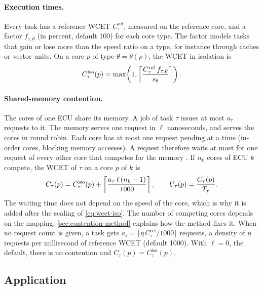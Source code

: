 \paragraph{Execution times.} Every task has a reference WCET
$C^{\mathrm{ref}}_\tau$, measured on the reference core, and a factor
$f_{\tau,\theta}$ (in percent, default 100) for each core type. The factor
models tasks that gain or lose more than the speed ratio on a type, for
instance through caches or vector units. On a core $p$ of type $\theta=
\theta(p)$, the WCET in isolation is
\begin{equation}
C^{\mathrm{iso}}_\tau(p)=\max\!\left(1,\left\lceil \frac{C^{\mathrm{ref}}_\tau\,
f_{\tau,\theta}}{s_\theta} \right\rceil\right).
\label{eq:wcet-iso}
\end{equation}

\paragraph{Shared-memory contention.}
\label{sec:contention}
The cores of one ECU share its memory. A job of task $\tau$ issues at most
$a_\tau$ requests to it. The memory serves one request in $\ell$
nanoseconds, and serves the cores in round robin. Each core has at most one
request pending at a time (in-order cores, blocking memory accesses). A
request therefore waits at most for one request of every other core that
competes for the memory \cite{paolieri2009hardware}. If $n_k$ cores of ECU $k$ compete, the
WCET of $\tau$ on a core $p$ of $k$ is
\begin{equation}
C_\tau(p)=C^{\mathrm{iso}}_\tau(p)+\left\lceil \frac{a_\tau\,\ell\,(n_k-1)}{1000} \right\rceil,
\qquad U_\tau(p)=\frac{C_\tau(p)}{T_\tau}.
\label{eq:wcet}
\end{equation}
The waiting time does not depend on the speed of the core, which is why it
is added after the scaling of \cref{eq:wcet-iso}. The number of competing
cores depends on the mapping: \cref{sec:contention-method} explains how
the method fixes it. When no request count is given, a task gets $a_\tau=
\lceil\eta\,C^{\mathrm{ref}}_\tau/1000\rceil$ requests, a density of
$\eta$ requests per millisecond of reference WCET (default 1000). With
$\ell=0$, the default, there is no contention and $C_\tau(p)=
C^{\mathrm{iso}}_\tau(p)$.

\subsection{Application}
\label{sec:application}

